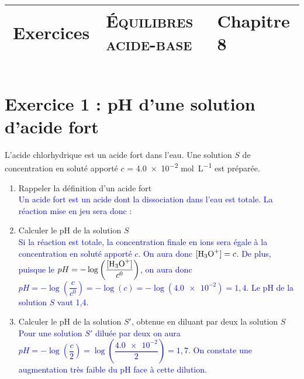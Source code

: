 \documentclass[a4paper,12pt]{article}
\title{\vspace{-1cm}\large 
	\begin{tabular}{|>{\centering}m{5cm}|>{\centering}m{8cm}|>{\centering\arraybackslash}m{4cm}|}
	\hline
	Exercices & \textbf{\textsc{Équilibres acide-base}} &  Chapitre 8\\
	\hline
	\end{tabular}}
\date{}
\begin{document}
\maketitle
\vspace{-2.5cm}

\section*{Exercice 1 : pH d'une solution d'acide fort}
L'acide chlorhydrique est un acide fort dans l'eau. Une solution $S$ de concentration en soluté apporté $c$ = \num{4,0e-2} \unit{\mole \per \liter} est préparée.
\begin{enumerate}
	\item Rappeler la définition d'un acide fort\\
	\textcolor{blue}{Un acide fort est un acide dont la dissociation dans l'eau est totale. La réaction mise en jeu sera donc : }
	\item Calculer le pH de la solution $S$\\
	\textcolor{blue}{Si la réaction est totale, la concentration finale en ions  sera égale à la concentration en soluté apporté $c$. On aura donc $[\ce{H3O+}]=c$. De plus, puisque le $pH=-\log\left(\dfrac{[\ce{H3O+}]}{c^0}\right)$, on aura donc $pH= -\log\left(\dfrac{c}{c^0}\right) = -\log(c) = -\log(\num{4,0e-2})=1,4$. Le pH de la solution $S$ vaut 1,4.}
	\item Calculer le pH de la solution $S'$, obtenue en diluant par deux la solution $S$\\
	\textcolor{blue}{Pour une solution $S'$ diluée par deux on aura $pH = -\log(\dfrac{c}{2}) = \log\left(\dfrac{\num{4,0e-2}}{2}\right) = 1,7$. On constate une augmentation très faible du pH face à cette dilution.}
\end{enumerate}
\end{document}
